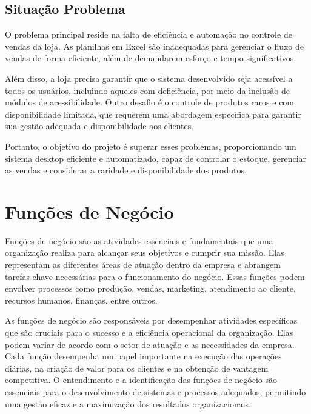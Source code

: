 \documentclass[
	12pt,				%
	openright,			%
	twoside,			%
	a4paper,			%
	english,			%
	brazil				%
	]{abntex2}
\begin{document}
\section{Situação Problema}
O problema principal reside na falta de eficiência e automação no controle de vendas da loja. As planilhas em Excel são inadequadas para gerenciar o fluxo de vendas de forma eficiente, além de demandarem esforço e tempo significativos.

Além disso, a loja precisa garantir que o sistema desenvolvido seja acessível a todos os usuários, incluindo aqueles com deficiência, por meio da inclusão de módulos de acessibilidade. Outro desafio é o controle de produtos raros e com disponibilidade limitada, que requerem uma abordagem específica para garantir sua gestão adequada e disponibilidade aos clientes.

Portanto, o objetivo do projeto é superar esses problemas, proporcionando um sistema desktop eficiente e automatizado, capaz de controlar o estoque, gerenciar as vendas e considerar a raridade e disponibilidade dos produtos.

\chapter{Funções de Negócio}\label{func_neg}
Funções de negócio são as atividades essenciais e fundamentais que uma organização realiza para alcançar seus objetivos e cumprir sua missão. Elas representam as diferentes áreas de atuação dentro da empresa e abrangem tarefas-chave necessárias para o funcionamento do negócio. Essas funções podem envolver processos como produção, vendas, marketing, atendimento ao cliente, recursos humanos, finanças, entre outros.

As funções de negócio são responsáveis por desempenhar atividades específicas que são cruciais para o sucesso e a eficiência operacional da organização. Elas podem variar de acordo com o setor de atuação e as necessidades da empresa. Cada função desempenha um papel importante na execução das operações diárias, na criação de valor para os clientes e na obtenção de vantagem competitiva. O entendimento e a identificação das funções de negócio são essenciais para o desenvolvimento de sistemas e processos adequados, permitindo uma gestão eficaz e a maximização dos resultados organizacionais.
\end{document}
